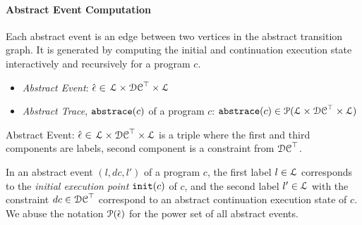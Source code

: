  \paragraph{Abstract Event Computation} Each abstract event is an edge between two vertices in the abstract transition graph.
 It is generated by computing the initial and continuation execution state interactively and recursively for a program $c$.
 
 \begin{itemize}
  \item \emph{Abstract Event}: 
  $\hat{\mathtt{\epsilon}{}} \in $
  $\mathcal{L} \times \mathcal{DC}^{\top} \times \mathcal{L}$
  \item \emph{Abstract Trace}, $\mathtt{abs}{\mathtt{trace}}(c)$ of a program $c$: $\mathtt{abs}{\mathtt{trace}}(c) \in \mathcal{P}( \mathcal{L} \times \mathcal{DC}^{\top} \times \mathcal{L} )$
 \end{itemize}
 \begin{defn}
   \label{def:abs_event}
   Abstract Event: 
   $\hat{\mathtt{\epsilon}{}} \in $
   $\mathcal{L} \times \mathcal{DC}^{\top} \times \mathcal{L}$
   is a 
   triple where the first and third components are labels,
   second component is a constraint from $\mathcal{DC}^{\top}$.
   \end{defn}
   In an abstract event $(l, dc, l')$ of a program $c$, 
   the first label $l \in \mathcal{L}$ corresponds to the \emph{initial execution point} $\mathtt{init}(c)$ of $c$, and 
   the second label $l' \in \mathcal{L}$ with the constraint $dc \in \mathcal{DC}^{\top}$ correspond to an abstract continuation execution state of $c$.
We abuse the notation $\mathcal{P}(\hat{\mathtt{\epsilon}{}})$ for the power set of all abstract events.

